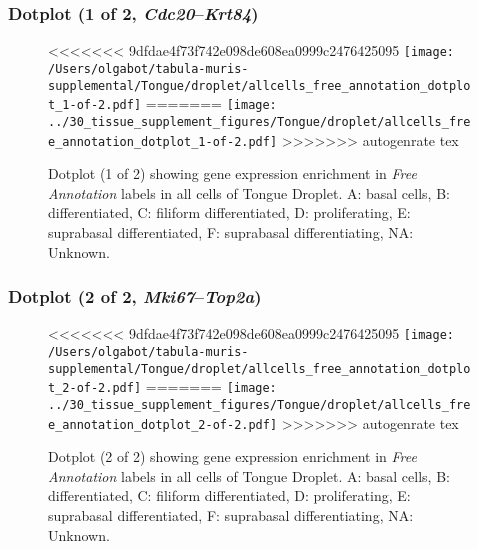 \clearpage

\subsubsection{Dotplot (1 of 2, \emph{Cdc20}--\emph{Krt84})}
\begin{figure}[h]
\centering
<<<<<<< 9dfdae4f73f742e098de608ea0999c2476425095
\texttt{[image: /Users/olgabot/tabula-muris-supplemental/Tongue/droplet/allcells\_free\_annotation\_dotplot\_1-of-2.pdf]}
=======
\texttt{[image: ../30\_tissue\_supplement\_figures/Tongue/droplet/allcells\_free\_annotation\_dotplot\_1-of-2.pdf]}
>>>>>>> autogenrate tex

\caption{ Dotplot (1 of 2)  showing gene expression enrichment in \emph{Free Annotation} labels in all cells of Tongue Droplet. A: basal cells, B: differentiated, C: filiform differentiated, D: proliferating, E: suprabasal differentiated, F: suprabasal differentiating, NA: Unknown.}
\end{figure}


\clearpage

\subsubsection{Dotplot (2 of 2, \emph{Mki67}--\emph{Top2a})}
\begin{figure}[h]
\centering
<<<<<<< 9dfdae4f73f742e098de608ea0999c2476425095
\texttt{[image: /Users/olgabot/tabula-muris-supplemental/Tongue/droplet/allcells\_free\_annotation\_dotplot\_2-of-2.pdf]}
=======
\texttt{[image: ../30\_tissue\_supplement\_figures/Tongue/droplet/allcells\_free\_annotation\_dotplot\_2-of-2.pdf]}
>>>>>>> autogenrate tex

\caption{ Dotplot (2 of 2)  showing gene expression enrichment in \emph{Free Annotation} labels in all cells of Tongue Droplet. A: basal cells, B: differentiated, C: filiform differentiated, D: proliferating, E: suprabasal differentiated, F: suprabasal differentiating, NA: Unknown.}
\end{figure}

